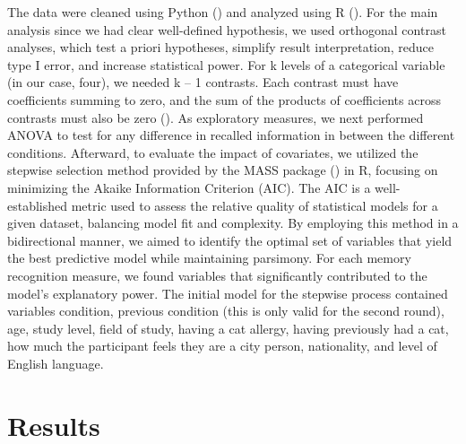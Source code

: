 \documentclass[
  man,
  longtable,
  nolmodern,
  notxfonts,
  notimes,
  colorlinks=true,linkcolor=blue,citecolor=blue,urlcolor=blue]{apa7}
\begin{document}
The data were cleaned using Python () and analyzed using R (). For the main analysis since we had clear
well-defined hypothesis, we used orthogonal contrast analyses, which
test a priori hypotheses, simplify result interpretation, reduce type I
error, and increase statistical power. For k levels of a categorical
variable (in our case, four), we needed k -- 1 contrasts. Each contrast
must have coefficients summing to zero, and the sum of the products of
coefficients across contrasts must also be zero
(). As exploratory measures, we next performed ANOVA to test for any
difference in recalled information in between the different conditions.
Afterward, to evaluate the impact of covariates, we utilized the
stepwise selection method provided by the MASS package
() in R, focusing on minimizing the Akaike Information Criterion
(AIC). The AIC is a well-established metric used to assess the relative
quality of statistical models for a given dataset, balancing model fit
and complexity. By employing this method in a bidirectional manner, we
aimed to identify the optimal set of variables that yield the best
predictive model while maintaining parsimony. For each memory
recognition measure, we found variables that significantly contributed
to the model's explanatory power. The initial model for the stepwise
process contained variables condition, previous condition (this is only
valid for the second round), age, study level, field of study, having a
cat allergy, having previously had a cat, how much the participant feels
they are a city person, nationality, and level of English language.

\section{Results}\label{results}
\end{document}
